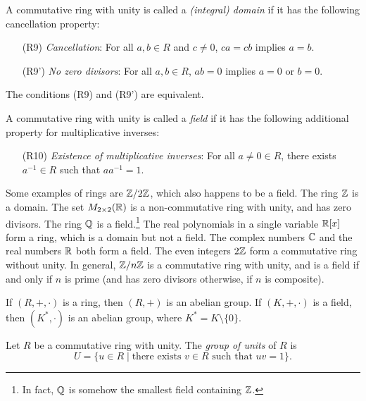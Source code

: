 \begin{definition}[Domain]
A commutative ring with unity is called a
\emph{(integral) domain} if it has the following
cancellation property:
\begin{enumerate}
  \item[(R9)] \emph{Cancellation}: For all
    $a, b \in R$ and $c \ne 0$, $ca = cb$ implies
    $a = b$.
  \item[(R9')] \textit{No zero divisors}: For all
    $a, b \in R$, $ab = 0$ implies $a = 0$ or $b = 0$.
\end{enumerate}
\end{definition}

The conditions (R9) and (R9') are equivalent.

\begin{definition}[Field]
A commutative ring with unity is called a \emph{field}
if it has the following additional property for
multiplicative inverses:
\begin{enumerate}
  \item[(R10)] \emph{Existence of multiplicative inverses}:
    For all $a \ne 0 \in R$, there exists
    $a^{-1} \in R$ such that $aa^{-1} = 1$.
\end{enumerate}
\end{definition}

\begin{example}
  Some examples of rings are $\mathbb{Z} / 2\mathbb{Z}$, which
  also happens to be a field. The ring $\mathbb{Z}$ is a domain.
  The set $M_{2 \times 2}(\mathbb{R})$ is a non-commutative ring
  with unity, and has zero divisors. The ring
  $\mathbb{Q}$ is a field.\footnote{In fact, $\mathbb{Q}$ is somehow the smallest field containing $\mathbb{Z}$.} The real polynomials in a single
  variable $\mathbb{R}[x]$ form a ring, which is a domain but
  not a field. The complex numbers $\mathbb{C}$ and the
  real numbers $\mathbb{R}$ both form a field. The
  even integers $2\mathbb{Z}$ form a commutative ring without
  unity. In general, $\mathbb{Z} / n\mathbb{Z}$ is a commutative ring
  with unity, and is a field if and only if $n$ is prime
  (and has zero divisors otherwise, if $n$ is composite).
\end{example}

\begin{remark}
  If $(R, +, \cdot)$ is a ring, then $(R, +)$ is an
  abelian group. If $(K, +, \cdot)$ is a field,
  then $(K^*, \cdot)$ is an abelian group, where
  $K^* = K \setminus \{0\}$.
\end{remark}

\begin{definition}
  Let $R$ be a commutative ring with unity. The
  \emph{group of units} of $R$ is
  \[U = \{u \in R \mid \text{there exists $v \in R$ such that $uv = 1$}\}.\]
\end{definition}

